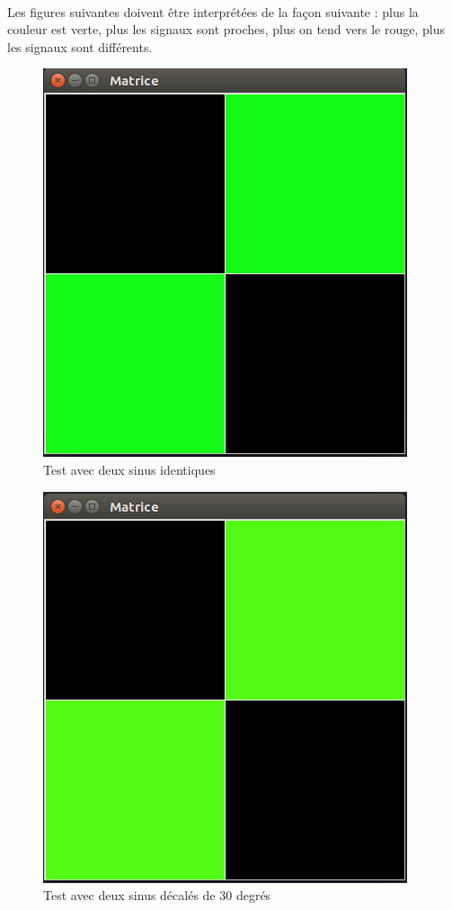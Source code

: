 \paragraph{}
Les figures suivantes doivent être interprétées de la façon suivante : plus la couleur est verte, plus les signaux sont proches, plus on tend vers le rouge, plus les signaux sont différents.
\begin{figure}[H]
    \centering
    \includegraphics[scale=0.3]{assets/Captures-sinus/PreprocDefaultnormal-normal.png}
    \caption{Test avec deux sinus identiques}
    \label{}
\end{figure}
\begin{figure}[H]
    \centering
    \includegraphics[scale=0.3]{assets/Captures-sinus/PreprocDefaultnormal-30.png}
    \caption{Test avec deux sinus décalés de 30 degrés}
    \label{}
\end{figure}
